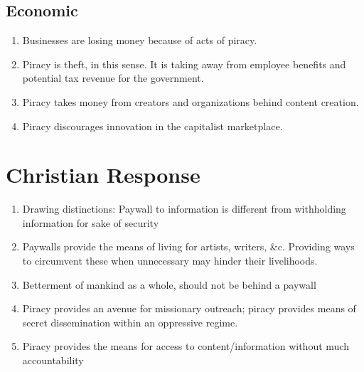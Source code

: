 \documentclass[onecolumn, 12pt]{article}
\begin{document}
\subsection{Economic}
\begin{enumerate}
  \item Businesses are losing money because of acts of piracy.
  \item Piracy is theft, in this sense. It is taking away from employee
    benefits and potential tax revenue for the government.

  \item Piracy takes money from creators and organizations behind content
    creation.~\cite{congress:pirating-the-american-dream}

  \item {}

    Piracy discourages innovation in the capitalist marketplace.
\end{enumerate}

\section{Christian Response}

\begin{enumerate}
  \item Drawing distinctions: Paywall to information is different from
    withholding information for sake of security

  \item Paywalls provide the means of living for artists, writers, \&c. Providing
    ways to circumvent these when unnecessary may hinder their livelihoods.

  \item Betterment of mankind as a whole, should not be behind a paywall

  \item Piracy provides an avenue for missionary outreach; piracy provides
    means of secret dissemination within an oppressive regime.

  \item Piracy provides the means for access to content/information without
    much accountability
\end{enumerate}
\end{document}
